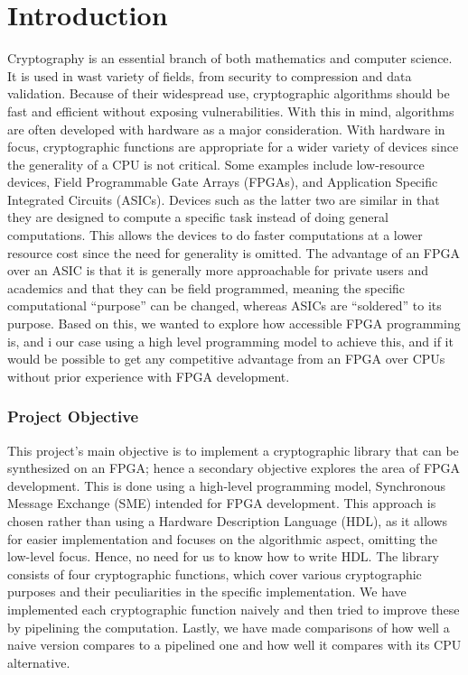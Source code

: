 \documentclass[a4paper, openany]{book}
\begin{document}
\chapter{Introduction}
\label{sec:org6afb9bc}
Cryptography is an essential branch of both mathematics and computer science. It is used in wast variety of fields, from security to compression and data validation. Because of their widespread use, cryptographic algorithms should be fast and efficient without exposing vulnerabilities. With this in mind, algorithms are often developed with hardware as a major consideration. With hardware in focus, cryptographic functions are appropriate for a wider variety of devices since the generality of a CPU is not critical. Some examples include low-resource devices, Field Programmable Gate Arrays (FPGAs), and Application Specific Integrated Circuits (ASICs). Devices such as the latter two are similar in that they are designed to compute a specific task instead of doing general computations. This allows the devices to do faster computations at a lower resource cost since the need for generality is omitted. The advantage of an FPGA over an ASIC is that it is generally more approachable for private users and academics and that they can be field programmed, meaning the specific computational ``purpose'' can be changed, whereas ASICs are ``soldered'' to its purpose. Based on this, we wanted to explore how accessible FPGA programming is, and i our case using a high level programming model to achieve this, and if it would be possible to get any competitive advantage from an FPGA over CPUs without prior experience with FPGA development.

\subsection{Project Objective}
\label{sec:org1b3f4b8}
This project's main objective is to implement a cryptographic library that can be synthesized on an FPGA; hence a secondary objective explores the area of FPGA development. This is done using a high-level programming model, Synchronous Message Exchange (SME) intended for FPGA development. This approach is chosen rather than using a Hardware Description Language (HDL), as it allows for easier implementation and focuses on the algorithmic aspect, omitting the low-level focus. Hence, no need for us to know how to write HDL. The library consists of four cryptographic functions, which cover various cryptographic purposes and their peculiarities in the specific implementation. We have implemented each cryptographic function naively and then tried to improve these by pipelining the computation. Lastly, we have made comparisons of how well a naive version compares to a pipelined one and how well it compares with its CPU alternative.
\end{document}

